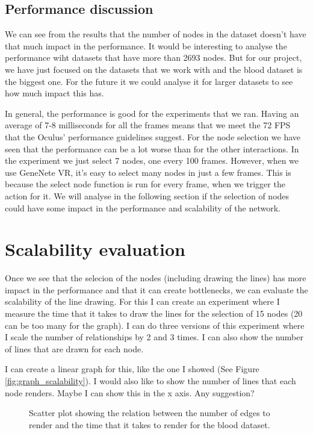 \subsection{Performance discussion}
We can see from the results that the number of nodes in the dataset doesn't have that much impact in the performance. It would be interesting to analyse the performance wiht datasets that have more than 2693 nodes. But for our project, we have just focused on the datasets that we work with and the blood dataset is the biggest one. For the future it we could analyse it for larger datasets to see how much impact this has.

In general, the performance is good for the experiments that we ran. Having an average of 7-8 milliseconds for all the frames means that we meet the 72 FPS that the Oculus' performance guidelines suggest. For the node selection we have seen that the performance can be a lot worse than for the other interactions. In the experiment we just select 7 nodes, one every 100 frames. However, when we use GeneNete VR, it's easy to select many nodes in just a few frames. This is because the select node function is run for every frame, when we trigger the action for it. We will analyse in the following section if the selection of nodes could have some impact in the performance and scalability of the network.

\section{Scalability evaluation}

Once we see that the selecion of the nodes (including drawing the lines) has more impact in the performance and that it can create bottlenecks, we can evaluate the scalability of the line drawing. For this I can create an experiment where I measure the time that it takes to draw the lines for the selection of 15 nodes (20 can be too many for the graph). I can do three versions of this experiment where I scale the number of relationships by 2 and 3 times. I can also show the number of lines that are drawn for each node.

I can create a linear graph for this, like the one I showed (See Figure \ref{fig:graph_scalability}). I would also like to show the number of lines that each node renders. Maybe I can show this in the x axis. Any suggestion?

\begin{figure}[h!]
  \centering
  \begin{minipage}{.8\textwidth}
  \end{minipage}
\caption{Scatter plot showing the relation between the number of edges to render and the time that it takes to render for the blood dataset.}
\label{fig:scalability_edges_blood}
\end{figure}

